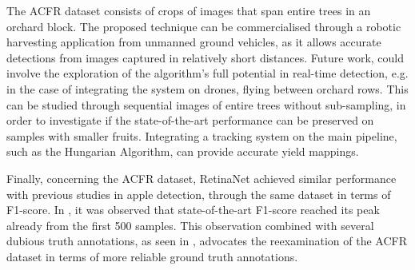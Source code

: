 The ACFR dataset consists of crops of images that span entire trees in an orchard block. The proposed technique can be commercialised through a robotic harvesting application from unmanned ground vehicles, as it allows accurate detections from images captured in relatively short distances. Future work, could involve the exploration of the algorithm's full potential in real-time detection, e.g. in the case of integrating the system on drones, flying between orchard rows. This can be studied through sequential images of entire trees without sub-sampling, in order to investigate if the state-of-the-art performance can be preserved on samples with smaller fruits. Integrating a tracking system on the main pipeline, such as the Hungarian Algorithm, can provide accurate yield mappings.

Finally, concerning the ACFR dataset, RetinaNet achieved similar performance with previous studies in apple detection, through the same dataset in terms of F1-score. In , it was observed that state-of-the-art F1-score reached its peak already from the first 500 samples. This observation combined with several dubious truth annotations, as seen in , advocates the reexamination of the ACFR dataset in terms of more reliable ground truth annotations.


